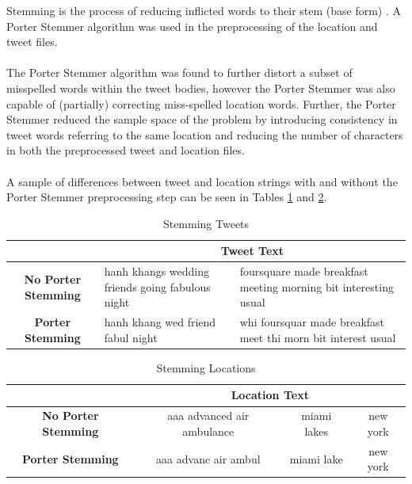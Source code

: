 \documentclass[11pt,a4paper]{article}
\begin{document}
Stemming is the process of reducing inflicted words to their stem (base form) \citep{pm-stem}. A Porter Stemmer algorithm was used in the preprocessing of the location and tweet files. \\\\
The Porter Stemmer algorithm was found to further distort a subset of misspelled words within the tweet bodies, however the Porter Stemmer was also capable of (partially) correcting miss-spelled location words. Further, the Porter Stemmer reduced the sample space of the problem by introducing consistency in tweet words referring to the same location and reducing the number of characters in both the preprocessed tweet and location files.\\\\
A sample of differences between tweet and location strings with and without the Porter Stemmer preprocessing step can be seen in Tables \ref{table:stem-tweet} and \ref{table:stem-location}.
   
\begin{table} [h]
\caption{Stemming Tweets}
\begin{center}
	\begin{tabular}{| c | p{5.5cm} | p{5.5cm} |}
	\hline
	  & \multicolumn{2}{|c|}{\textbf{Tweet Text}}\\
	\hline
	\textbf{No Porter Stemming} &  hanh khangs wedding friends going fabulous night & foursquare made breakfast meeting morning bit interesting usual\\
	\hline
	\textbf{Porter Stemming}  & hanh khang wed friend fabul night & whi foursquar made breakfast meet thi morn bit interest usual\\
	\hline
	\end{tabular}
\end{center}
\label{table:stem-tweet}
\end{table}

\begin{table} [h]
\caption{Stemming Locations}
\begin{center}
	\begin{tabular}{| c | c | c | c | }
	\hline
	 &  \multicolumn{3}{|c|}{\textbf{Location Text}}\\
	\hline
	\textbf{No Porter Stemming} & aaa advanced air ambulance
& miami lakes & new york\\
	\hline
	\textbf{Porter Stemming} &  aaa advanc air ambul
& miami lake & new york\\
	\hline
	\end{tabular}
\end{center}
\label{table:stem-location}
\end{table}
\end{document}

